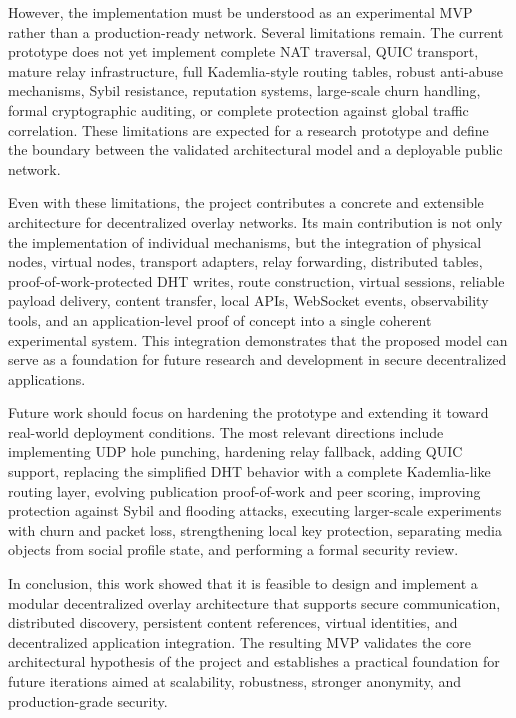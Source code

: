 \documentclass[12pt]{article}
\begin{document}
However, the implementation must be understood as an experimental MVP rather than a production-ready network. Several limitations remain. The current prototype does not yet implement complete NAT traversal, QUIC transport, mature relay infrastructure, full Kademlia-style routing tables, robust anti-abuse mechanisms, Sybil resistance, reputation systems, large-scale churn handling, formal cryptographic auditing, or complete protection against global traffic correlation. These limitations are expected for a research prototype and define the boundary between the validated architectural model and a deployable public network.

Even with these limitations, the project contributes a concrete and extensible architecture for decentralized overlay networks. Its main contribution is not only the implementation of individual mechanisms, but the integration of physical nodes, virtual nodes, transport adapters, relay forwarding, distributed tables, proof-of-work-protected DHT writes, route construction, virtual sessions, reliable payload delivery, content transfer, local APIs, WebSocket events, observability tools, and an application-level proof of concept into a single coherent experimental system. This integration demonstrates that the proposed model can serve as a foundation for future research and development in secure decentralized applications.

Future work should focus on hardening the prototype and extending it toward real-world deployment conditions. The most relevant directions include implementing UDP hole punching, hardening relay fallback, adding QUIC support, replacing the simplified DHT behavior with a complete Kademlia-like routing layer, evolving publication proof-of-work and peer scoring, improving protection against Sybil and flooding attacks, executing larger-scale experiments with churn and packet loss, strengthening local key protection, separating media objects from social profile state, and performing a formal security review.

In conclusion, this work showed that it is feasible to design and implement a modular decentralized overlay architecture that supports secure communication, distributed discovery, persistent content references, virtual identities, and decentralized application integration. The resulting MVP validates the core architectural hypothesis of the project and establishes a practical foundation for future iterations aimed at scalability, robustness, stronger anonymity, and production-grade security.
\end{document}
